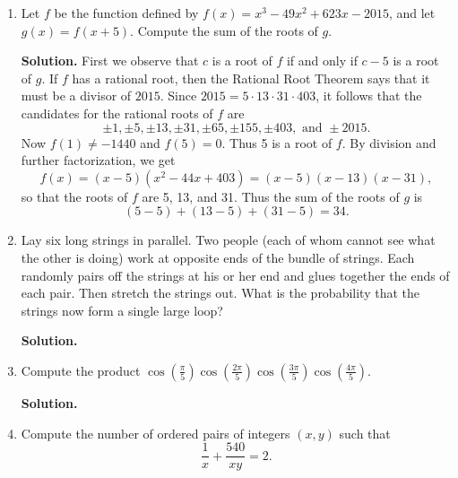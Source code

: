 \documentclass[9pt]{article}
\newcommand{\D}{\displaystyle}
\begin{document}
\begin{enumerate}
   \item Let $f$ be the function defined by $f(x) = x^3 - 49x^2 + 623x - 2015$,
         and let $g(x) = f(x + 5)$. Compute the sum of the roots of $g$.

      \textbf{Solution.} First we observe that $c$ is a root of $f$ if and only
      if $c-5$ is a root of $g$. If $f$ has a rational root, then the Rational
      Root Theorem says that it must be a divisor of $2015$. Since
      $2015 = 5 \cdot 13 \cdot 31 \cdot 403$, it follows that the candidates for 
      the rational roots of $f$ are
      $$\pm1, \pm5, \pm13, \pm31, \pm65, \pm155, \pm403, \text{ and } \pm2015.$$
      Now $f(1) \neq -1440$ and $f(5) = 0$. Thus 5 is a root of $f$. By
      division and further factorization, we get
      $$f(x) = (x - 5)(x^2 -44x + 403) = (x - 5)(x - 13)(x - 31),$$
      so that the roots of $f$ are 5, 13, and 31. Thus the sum of the roots of
      $g$ is
      $$(5 - 5) + (13 - 5) + (31 - 5) = 34.$$
   \item Lay six long strings in parallel. Two people (each of whom cannot see
         what the other is doing) work at opposite ends of the bundle of
         strings. Each randomly pairs off the strings at his or her end and
         glues together the ends of each pair. Then stretch the strings out.
         What is the probability that the strings now form a single large loop?

      \textbf{Solution.}
   \item Compute the product $\D\cos\left(\frac{\pi}{5}\right)\cos\left(
         \frac{2\pi}{5}\right)\cos\left(\frac{3\pi}{5}\right)\cos\left(
         \frac{4\pi}{5}\right)$.

      \textbf{Solution.}
   \item Compute the number of ordered pairs of integers $(x, y)$ such that
         \begin{equation} \label{4_2}
            \frac{1}{x} + \frac{540}{xy} = 2.
         \end{equation}


\end{enumerate}
\end{document}
